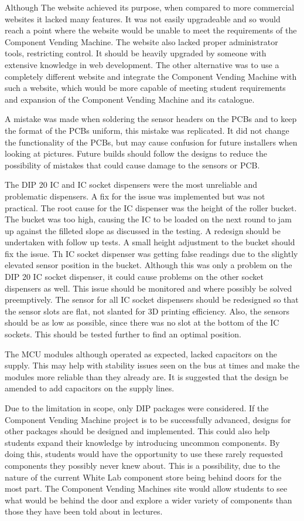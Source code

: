 \documentclass[a4paper,11pt]{article}
\numberwithin{figure}{section}
\numberwithin{table}{section}
\begin{document}
Although The website achieved its purpose, when compared to more commercial websites it lacked many features. It was not easily upgradeable and so would reach a point where the website would be unable to meet the requirements of the Component Vending Machine. The website also lacked proper administrator tools, restricting control. It should be heavily upgraded by someone with extensive knowledge in web development. The other alternative was to use a completely different website and integrate the Component Vending Machine with such a website, which would be more capable of meeting student requirements and expansion of the Component Vending Machine and its catalogue.

A mistake was made when soldering the sensor headers on the PCBs and to keep the format of the PCBs uniform, this mistake was replicated. It did not change the functionality of the PCBs, but may cause confusion for future installers when looking at pictures. Future builds should follow the designs to reduce the possibility of mistakes that could cause damage to the sensors or PCB.

The DIP 20 IC and IC socket dispensers were the most unreliable and problematic dispensers. A fix for the issue was implemented but was not practical. The root cause for the IC dispenser was the height of the roller bucket. The bucket was too high, causing the IC to be loaded on the next round to jam up against the filleted slope as discussed in the testing. A redesign should be undertaken with follow up tests. A small height adjustment to the bucket should fix the issue. Th IC socket dispenser was getting false readings due to the slightly elevated sensor position in the bucket. Although this was only a problem on the DIP 20 IC socket dispenser, it could cause problems on the other socket dispensers as well. This issue should be monitored and where possibly be solved preemptively. The sensor for all IC socket dispensers should be redesigned so that the sensor slots are flat, not slanted for 3D printing efficiency. Also, the sensors should be as low as possible, since there was no slot at the bottom of the IC sockets. This should be tested further to find an optimal position.

The MCU modules although operated as expected, lacked capacitors on the supply. This may help with stability issues seen on the bus at times and make the modules more reliable than they already are. It is suggested that the design be amended to add capacitors on the supply lines.

Due to the limitation in scope, only DIP packages were considered. If the Component Vending Machine project is to be successfully advanced, designs for other packages should be designed and implemented. This could also help students expand their knowledge by introducing uncommon components. By doing this, students would have the opportunity to use these rarely requested components they possibly never knew about. This is a possibility, due to the nature of the current White Lab component store being behind doors for the most part. The Component Vending Machines site would allow students to see what would be behind the door and explore a wider variety of components than those they have been told about in lectures.
\end{document}
